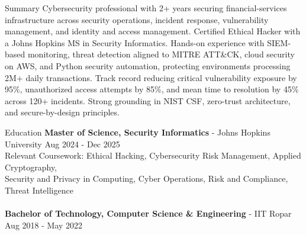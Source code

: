 \documentclass{resume}
\begin{document}
\begin{rSection}{Summary}
Cybersecurity professional with 2+ years securing financial-services infrastructure across security operations, incident response, vulnerability management, and identity and access management. Certified Ethical Hacker with a Johns Hopkins MS in Security Informatics. Hands-on experience with SIEM-based monitoring, threat detection aligned to MITRE ATT\&CK, cloud security on AWS, and Python security automation, protecting environments processing 2M+ daily transactions. Track record reducing critical vulnerability exposure by 95\%, unauthorized access attempts by 85\%, and mean time to resolution by 45\% across 120+ incidents. Strong grounding in NIST CSF, zero-trust architecture, and secure-by-design principles.
\end{rSection}

\vspace{-4mm}

\begin{rSection}{Education}
{\bf Master of Science, Security Informatics} - Johns Hopkins University \hfill {Aug 2024 - Dec 2025}\\
Relevant Coursework: Ethical Hacking, Cybersecurity Risk Management, Applied Cryptography, \\
\vspace{-2mm}
Security and Privacy in Computing, Cyber Operations, Risk and Compliance, Threat Intelligence\\
\vspace{-4mm}\\
{\bf Bachelor of Technology, Computer Science \& Engineering} - IIT Ropar \hfill {Aug 2018 - May 2022}
\end{rSection}

\vspace{-4mm}
\end{document}
